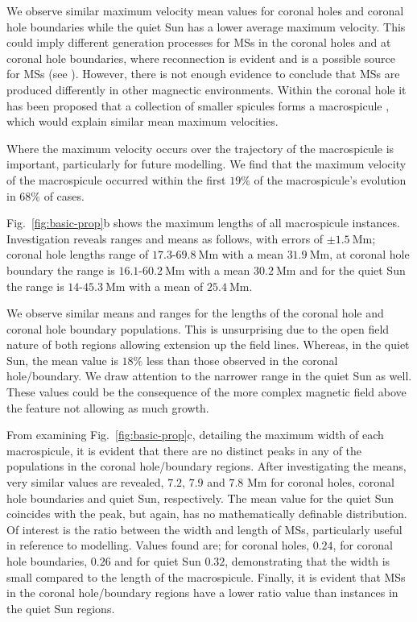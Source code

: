 We observe similar maximum velocity mean values for coronal holes and coronal hole boundaries while the quiet Sun has a lower average maximum velocity. This could imply different generation processes for MSs in the coronal holes and at coronal hole boundaries, where reconnection is evident \cite{Patsourakos1999} and is a possible source for MSs (see \cite{Heggland2009}). However, there is not enough evidence to conclude that MSs are produced differently in other magnectic environments. Within the coronal hole it has been proposed that a collection of smaller spicules forms a macrospicule \cite{Scullion2009}, which would explain similar mean maximum velocities.

Where the maximum velocity occurs over the trajectory of the macrospicule is important, particularly for future modelling. We find that the maximum velocity of the macrospicule occurred within the first $19\%$ of the macrospicule's evolution in $68\%$ of cases.

Fig.~\ref{fig:basic-prop}b shows the maximum lengths of all macrospicule instances. Investigation reveals ranges and means as follows, with errors of $\pm1.5\ \textrm{Mm}$; coronal hole lengths range of $17.3$-$69.8\ \textrm{Mm}$ with a mean $31.9\ \textrm{Mm}$, at coronal hole boundary the range is $16.1$-$60.2\ \textrm{Mm}$ with a mean $30.2\ \textrm{Mm}$ and for the quiet Sun the range is $14$-$45.3\ \textrm{Mm}$ with a mean of $25.4\ \textrm{Mm}$. 

We observe similar means and ranges for the lengths of the coronal hole and coronal hole boundary populations. This is unsurprising due to the open field nature of both regions allowing extension up the field lines. Whereas, in the quiet Sun, the mean value is $18\%$ less than those observed in the coronal hole/boundary. We draw attention to the narrower range in the quiet Sun as well. These values could be the consequence of the more complex magnetic field above the feature not allowing as much growth. 

From examining Fig.~\ref{fig:basic-prop}c, detailing the maximum width of each macrospicule, it is evident that there are no distinct peaks in any of the populations in the coronal hole/boundary regions. After investigating the means, very similar values are revealed, $7.2$, $7.9$ and $7.8$ Mm for coronal holes, coronal hole boundaries and quiet Sun, respectively. The mean value for the quiet Sun coincides with the peak, but again, has no mathematically definable distribution. Of interest is the ratio between the width and length of MSs, particularly useful in reference to modelling. Values found are; for coronal holes, $0.24$, for coronal hole boundaries, $0.26$ and for quiet Sun $0.32$, demonstrating that the width is small compared to the length of the macrospicule. Finally, it is evident that MSs in the coronal hole/boundary regions have a lower ratio value than instances in the quiet Sun regions.

